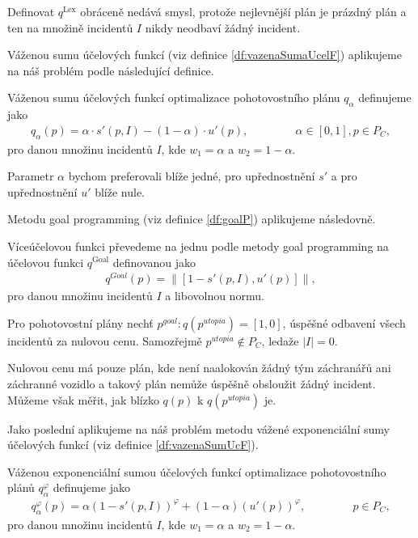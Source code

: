 Definovat $q^{\text{Lex}}$ obráceně nedává smysl, protože nejlevnější plán je prázdný plán a ten na množině incidentů $I$ nikdy neodbaví žádný incident.

Váženou sumu účelových funkcí (viz definice \ref{df:vazenaSumaUcelF}) aplikujeme na náš problém podle následující definice. 
\begin{definice}\label{df:vazenaSumaPohotovost}
  Váženou sumu účelových funkcí optimalizace pohotovostního plánu $q_{\alpha}$ definujeme jako
  \begin{align*}
    q_{\alpha}(p) = \alpha \cdot s'(p, I) - (1 - \alpha) \cdot u'(p), \hspace{50pt} \alpha \in [0, 1], p \in P_C,
  \end{align*}
  pro danou množinu incidentů $I$, kde $w_1 = \alpha$ a $w_2 = 1 - \alpha$.
\end{definice}

Parametr $\alpha$ bychom preferovali blíže jedné, pro upřednostnění $s'$ a pro upřednostnění $u'$ blíže nule.

Metodu goal programming (viz definice \ref{df:goalP}) aplikujeme následovně.
\begin{definice}
  Víceúčelovou funkci převedeme na jednu podle metody goal programming na účelovou funkci $q^{\text{Goal}}$ definovanou jako
  \begin{align*}
    q^{Goal}(p) = \| [1 - s'(p, I), u'(p)] \|,
  \end{align*}
  pro danou množinu incidentů $I$ a libovolnou normu.
\end{definice}

Pro pohotovostní plány nechť $p^{goal} \colon q(p^{utopia}) = [1, 0]$, úspěšné odbavení všech incidentů za nulovou cenu.
Samozřejmě $p^{utopia} \not \in P_C$, ledaže $|I| = 0$.

Nulovou cenu má pouze plán, kde není naalokován žádný tým záchranářů ani záchranné vozidlo a takový plán nemůže úspěšně obsloužit žádný incident. 
Můžeme však měřit, jak blízko $q(p)$ k $q(p^{utopia})$ je.

Jako poslední aplikujeme na náš problém metodu vážené exponenciální sumy účelových funkcí (viz definice \ref{df:vazenaSumUcF}).
\begin{definice}\label{df:vazenaSumaExpPohotovost}
  Váženou exponenciální sumou účelových funkcí optimalizace pohotovostního plánů $q_{\alpha}^{\varphi}$ definujeme jako 
  \begin{align*}
    q_{\alpha}^{\varphi}(p) = \alpha (1 - s'(p, I))^\varphi + (1 - \alpha)(u'(p))^\varphi, \hspace{50pt} p \in P_C,
  \end{align*}
  pro danou množinu incidentů $I$, kde $w_1 = \alpha$ a $w_2 = 1 - \alpha$.
\end{definice}

